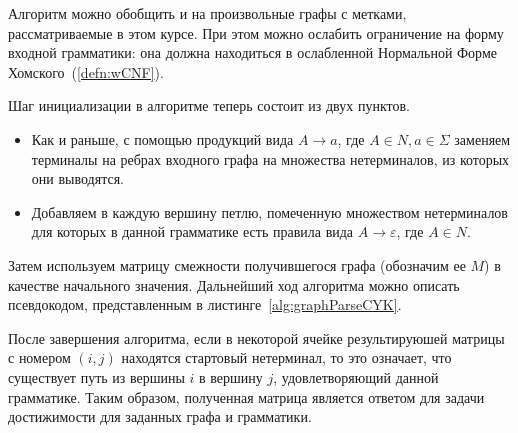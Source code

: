 Алгоритм можно обобщить и на произвольные графы с метками, рассматриваемые в этом курсе.
При этом можно ослабить ограничение на форму входной грамматики: она должна находиться в ослабленной Нормальной Форме Хомского~(\ref{defn:wCNF}).

Шаг инициализации в алгоритме теперь состоит из двух пунктов.
\begin{itemize}
    \item Как и раньше, с помощью продукций вида $A \to a$, где $A \in N, a \in \Sigma$ заменяем терминалы на ребрах входного графа на множества нетерминалов, из которых они выводятся.
    \item Добавляем в каждую вершину петлю, помеченную множеством нетерминалов для которых в данной грамматике есть правила вида $A \to \varepsilon$, где $A \in N$.
\end{itemize}

Затем используем матрицу смежности получившегося графа (обозначим ее $M$) в качестве начального значения.
Дальнейший ход алгоритма можно описать псевдокодом, представленным в листинге~\ref{alg:graphParseCYK}.



После завершения алгоритма, если в некоторой ячейке результируюшей матрицы с номером $(i, j)$ находятся стартовый нетерминал, то это означает, что существует путь из вершины $i$ в вершину $j$, удовлетворяющий данной грамматике.
Таким образом, полученная матрица является ответом для задачи достижимости для заданных графа и грамматики.

